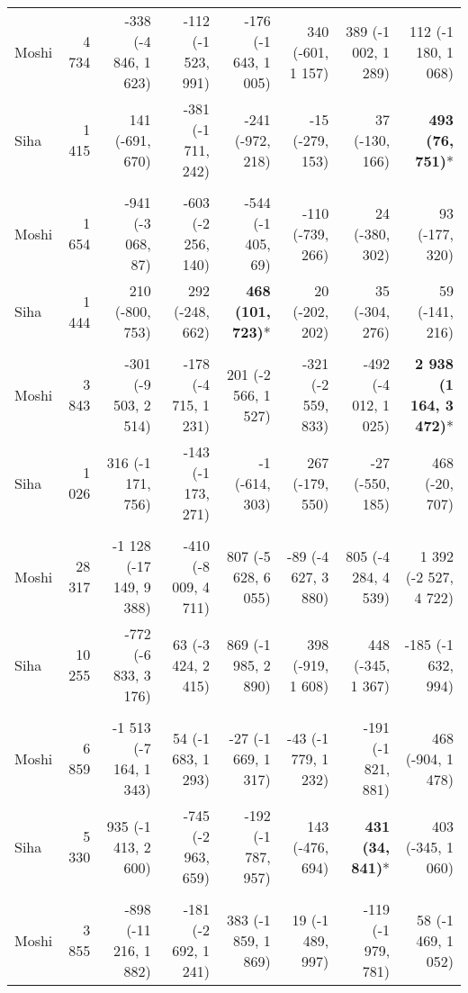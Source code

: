 \begin{table}[t]
\begin{tabular*}{\linewidth}{@{\extracolsep{\fill}}l|rrrrrrr}
\midrule\addlinespace[2.5pt]
Moshi & 4 734 & -338 (-4 846, 1 623) & -112 (-1 523, 991) & -176 (-1 643, 1 005) & 340 (-601, 1 157) & 389 (-1 002, 1 289) & 112 (-1 180, 1 068) \\ 
Siha & 1 415 & 141 (-691, 670) & -381 (-1 711, 242) & -241 (-972, 218) & -15 (-279, 153) & 37 (-130, 166) & \textbf{493 (76, 751)}* \\ 
\midrule\addlinespace[2.5pt]
\multicolumn{8}{l}{Snake and Insect Bites} \\[2.5pt] 
\midrule\addlinespace[2.5pt]
Moshi & 1 654 & -941 (-3 068, 87) & -603 (-2 256, 140) & -544 (-1 405, 69) & -110 (-739, 266) & 24 (-380, 302) & 93 (-177, 320) \\ 
Siha & 1 444 & 210 (-800, 753) & 292 (-248, 662) & \textbf{468 (101, 723)}* & 20 (-202, 202) & 35 (-304, 276) & 59 (-141, 216) \\ 
\midrule\addlinespace[2.5pt]
\multicolumn{8}{l}{Substance Abuse} \\[2.5pt] 
\midrule\addlinespace[2.5pt]
Moshi & 3 843 & -301 (-9 503, 2 514) & -178 (-4 715, 1 231) & 201 (-2 566, 1 527) & -321 (-2 559, 833) & -492 (-4 012, 1 025) & \textbf{2 938 (1 164, 3 472)}* \\ 
Siha & 1 026 & 316 (-1 171, 756) & -143 (-1 173, 271) & -1 (-614, 303) & 267 (-179, 550) & -27 (-550, 185) & 468 (-20, 707) \\ 
\midrule\addlinespace[2.5pt]
\multicolumn{8}{l}{Fractures} \\[2.5pt] 
\midrule\addlinespace[2.5pt]
Moshi & 28 317 & -1 128 (-17 149, 9 388) & -410 (-8 009, 4 711) & 807 (-5 628, 6 055) & -89 (-4 627, 3 880) & 805 (-4 284, 4 539) & 1 392 (-2 527, 4 722) \\ 
Siha & 10 255 & -772 (-6 833, 3 176) & 63 (-3 424, 2 415) & 869 (-1 985, 2 890) & 398 (-919, 1 608) & 448 (-345, 1 367) & -185 (-1 632, 994) \\ 
\midrule\addlinespace[2.5pt]
\multicolumn{8}{l}{Road Traffic Accidents} \\[2.5pt] 
\midrule\addlinespace[2.5pt]
Moshi & 6 859 & -1 513 (-7 164, 1 343) & 54 (-1 683, 1 293) & -27 (-1 669, 1 317) & -43 (-1 779, 1 232) & -191 (-1 821, 881) & 468 (-904, 1 478) \\ 
Siha & 5 330 & 935 (-1 413, 2 600) & -745 (-2 963, 659) & -192 (-1 787, 957) & 143 (-476, 694) & \textbf{431 (34, 841)}* & 403 (-345, 1 060) \\ 
\midrule\addlinespace[2.5pt]
\multicolumn{8}{l}{Typhoid} \\[2.5pt] 
\midrule\addlinespace[2.5pt]
Moshi & 3 855 & -898 (-11 216, 1 882) & -181 (-2 692, 1 241) & 383 (-1 859, 1 869) & 19 (-1 489, 997) & -119 (-1 979, 781) & 58 (-1 469, 1 052) \\ 

\end{tabular*}
\end{table}
